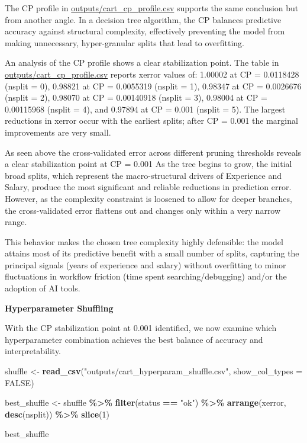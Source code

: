 \documentclass[
]{article}
\newenvironment{Shaded}{\begin{snugshade}}{\end{snugshade}}
\newcommand{\AttributeTok}[1]{\textcolor[rgb]{0.13,0.29,0.53}{#1}}
\newcommand{\ConstantTok}[1]{\textcolor[rgb]{0.56,0.35,0.01}{#1}}
\newcommand{\DecValTok}[1]{\textcolor[rgb]{0.00,0.00,0.81}{#1}}
\newcommand{\FunctionTok}[1]{\textcolor[rgb]{0.13,0.29,0.53}{\textbf{#1}}}
\newcommand{\NormalTok}[1]{#1}
\newcommand{\OtherTok}[1]{\textcolor[rgb]{0.56,0.35,0.01}{#1}}
\newcommand{\SpecialCharTok}[1]{\textcolor[rgb]{0.81,0.36,0.00}{\textbf{#1}}}
\newcommand{\StringTok}[1]{\textcolor[rgb]{0.31,0.60,0.02}{#1}}
\begin{document}
The CP profile in \url{outputs/cart_cp_profile.csv} supports the same
conclusion but from another angle. In a decision tree algorithm, the CP
balances predictive accuracy against structural complexity, effectively
preventing the model from making unnecessary, hyper-granular splits that
lead to overfitting.

An analysis of the CP profile shows a clear stabilization point. The
table in \url{outputs/cart_cp_profile.csv} reports xerror values of:
1.00002 at CP = 0.0118428 (nsplit = 0), 0.98821 at CP = 0.0055319
(nsplit = 1), 0.98347 at CP = 0.0026676 (nsplit = 2), 0.98070 at CP =
0.00140918 (nsplit = 3), 0.98004 at CP = 0.00115968 (nsplit = 4), and
0.97894 at CP = 0.001 (nsplit = 5). The largest reductions in xerror
occur with the earliest splits; after CP = 0.001 the marginal
improvements are very small.

As seen above the cross-validated error across different pruning
thresholds reveals a clear stabilization point at CP = 0.001 As the tree
begins to grow, the initial broad splits, which represent the
macro-structural drivers of Experience and Salary, produce the most
significant and reliable reductions in prediction error. However, as the
complexity constraint is loosened to allow for deeper branches, the
cross-validated error flattens out and changes only within a very narrow
range.

This behavior makes the chosen tree complexity highly defensible: the
model attains most of its predictive benefit with a small number of
splits, capturing the principal signals (years of experience and salary)
without overfitting to minor fluctuations in workflow friction (time
spent searching/debugging) and/or the adoption of AI tools.

\textbf{Hyperparameter Shuffling}

With the CP stabilization point at 0.001 identified, we now examine
which hyperparameter combination achieves the best balance of accuracy
and interpretability.

\begin{Shaded}
\begin{Highlighting}[]
\NormalTok{shuffle }\OtherTok{\textless{}{-}} \FunctionTok{read\_csv}\NormalTok{(}\StringTok{"outputs/cart\_hyperparam\_shuffle.csv"}\NormalTok{, }\AttributeTok{show\_col\_types =} \ConstantTok{FALSE}\NormalTok{)}

\NormalTok{best\_shuffle }\OtherTok{\textless{}{-}}\NormalTok{ shuffle }\SpecialCharTok{\%\textgreater{}\%}
  \FunctionTok{filter}\NormalTok{(status }\SpecialCharTok{==} \StringTok{"ok"}\NormalTok{) }\SpecialCharTok{\%\textgreater{}\%}
  \FunctionTok{arrange}\NormalTok{(xerror, }\FunctionTok{desc}\NormalTok{(nsplit)) }\SpecialCharTok{\%\textgreater{}\%}
  \FunctionTok{slice}\NormalTok{(}\DecValTok{1}\NormalTok{)}

\NormalTok{best\_shuffle}
\end{Highlighting}
\end{Shaded}
\end{document}
